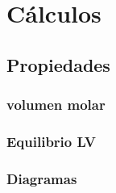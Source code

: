 \chapter{Cálculos}
	
	


	\section{Propiedades}	
		
		
		

			

		
		
		
		
		
		
		
		
		\subsection{volumen molar}
		\subsection{Equilibrio LV}
		
		
		
		
		
		\subsection{Diagramas}
	
